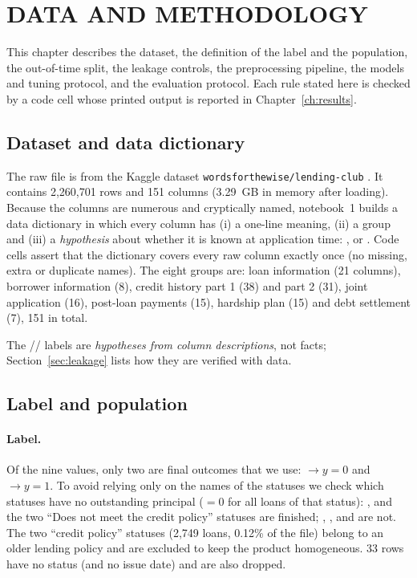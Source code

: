 \section{DATA AND METHODOLOGY}
\label{ch:method}

This chapter describes the dataset, the definition of the label and the population, the out-of-time split, the leakage controls, the preprocessing pipeline, the models and tuning protocol, and the evaluation protocol. Each rule stated here is checked by a code cell whose printed output is reported in Chapter~\ref{ch:results}.

\subsection{Dataset and data dictionary}
\label{sec:data}

The raw file is  from the Kaggle dataset \texttt{wordsforthewise/lending-club} \cite{kaggle_lc}. It contains 2,260,701 rows and 151 columns (3.29~GB in memory after loading). Because the columns are numerous and cryptically named, notebook~1 builds a data dictionary in which every column has (i) a one-line meaning, (ii) a group and (iii) a \emph{hypothesis} about whether it is known at application time: ,  or . Code cells assert that the dictionary covers every raw column exactly once (no missing, extra or duplicate names). The eight groups are: loan information (21 columns), borrower information (8), credit history part 1 (38) and part 2 (31), joint application (16), post-loan payments (15), hardship plan (15) and debt settlement (7), 151 in total.

The // labels are \emph{hypotheses from column descriptions}, not facts; Section~\ref{sec:leakage} lists how they are verified with data.

\subsection{Label and population}
\label{sec:filters}

\paragraph{Label.} Of the nine  values, only two are final outcomes that we use:  $\to y=0$ and  $\to y=1$. To avoid relying only on the names of the statuses we check which statuses have no outstanding principal ($=0$ for all loans of that status): ,  and the two ``Does not meet the credit policy'' statuses are finished; , ,  and  are not. The two ``credit policy'' statuses (2,749 loans, 0.12\% of the file) belong to an older lending policy and are excluded to keep the product homogeneous. 33 rows have no status (and no issue date) and are also dropped.

